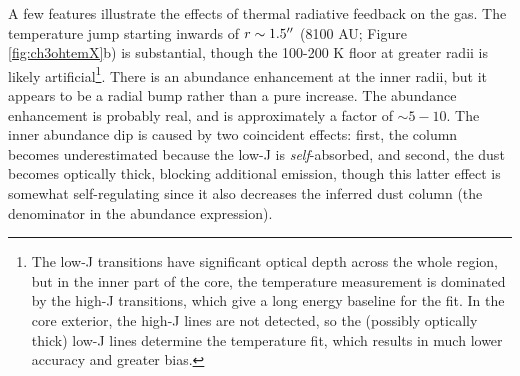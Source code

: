 \documentclass{emulateapj}
\begin{document}
A few features illustrate the effects of thermal radiative feedback on the gas.
The temperature jump starting inwards of  $r\sim1.5\mbox{$^{\prime\prime}$}$ (8100 AU; Figure
\ref{fig:ch3ohtemX}b) is
substantial, though the 100-200 K floor at greater radii is likely
artificial\footnote{The low-J transitions have significant optical depth
across the whole region, but in the inner part of the core, the temperature
measurement is dominated by the high-J transitions, which give a long
energy baseline for the fit.  In the core exterior, the high-J lines are
not detected, so the (possibly optically thick) low-J lines determine
the temperature fit, which results in much lower accuracy and greater
bias.}.
There is an abundance enhancement at the inner radii, but it appears to be a
radial bump rather than a pure increase.  The abundance enhancement is probably real,
and is approximately a factor of $\sim5-10$.  The inner abundance dip
is caused by two coincident effects: first, the \methanol column becomes underestimated
because the low-J \methanol is \emph{self}-absorbed, and second, the dust
becomes optically thick, blocking additional \methanol emission, though this
latter effect is somewhat self-regulating since it also decreases the inferred
dust column (the denominator in the abundance expression).
\end{document}
